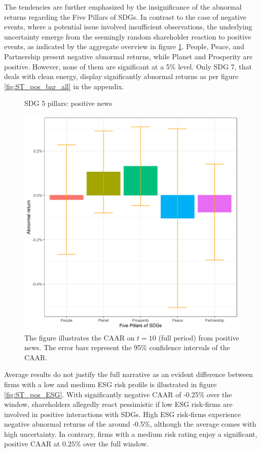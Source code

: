 The tendencies are further emphasized by the insignificance of the abnormal returns regarding the Five Pillars of SDGs. In contrast to the case of negative events, where a potential issue involved insufficient observations, the underlying uncertainty emerge from the seemingly random shareholder reaction to positive events, as indicated by the aggregate overview in figure \ref{fig:ST_pos_bar}. People, Peace, and Partnership present negative abnormal returns, while Planet and Prosperity are positive. However, none of them are significant at a 5\% level. Only SDG 7, that deals with clean energy, display significantly abnormal returns as per figure \ref{fig:ST_pos_bar_all} in the appendix. 

\begin{figure} [H]
    \centering
    \caption{SDG 5 pillars: positive news}
    \includegraphics[scale=0.6]{Projekt/1.Figures analysis/ST_positive_sdg_bar_groups_0.png}
    \caption*{\footnotesize The figure illustrates the CAAR on $t = 10$ (full period) from positive news. The error bars represent the 95\% confidence intervals of the CAAR.}
    \label{fig:ST_pos_bar}
\end{figure}

 
Average results do not justify the full narrative as an evident difference between firms with a low and medium ESG risk profile is illustrated in figure \ref{fig:ST_pos_ESG}. With significantly negative CAAR of -0.25\% over the window, shareholders allegedly react pessimistic if low ESG risk-firms are involved in positive interactions with SDGs. High ESG risk-firms experience negative abnormal returns of the around -0.5\%, although the average comes with high uncertainty. In contrary, firms with a medium risk rating enjoy a significant, positive CAAR at $0.25\%$ over the full window. 

